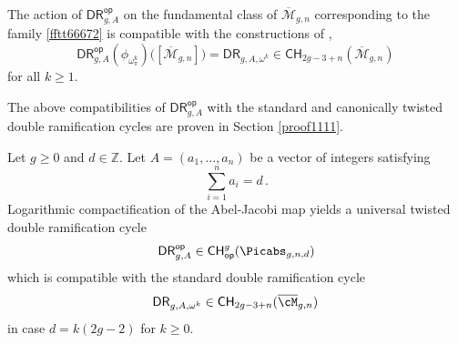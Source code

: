 The action of $\mathsf{DR}^{\mathsf{op}}_{g,A}$ on the fundamental class
of $\overline{\mathcal{M}}_{g,n}$ corresponding to the family \eqref{fftt66672} is compatible with the constructions of \cite{Guere2016A-generalizatio,Holmes2017Extending-the-d,Holmes2017Jacobian-extens,Marcus2017Logarithmic-com},
$$\mathsf{DR}^{\mathsf{op}}_{g,A} (\phi_{\omega_\pi^k})\Big( [\overline{\mathcal{M}}_{g,n}]\Big)= \mathsf{DR}_{g,A, \omega^k}
\in {\mathsf{CH}}_{2g-3+n}(\overline{\mathcal{M}}_{g,n})
\, $$
for all $k\geq 1$.

The above compatibilities of $\mathsf{DR}^{\mathsf{op}}_{g,A}$ with
the standard and canonically twisted double ramification cycles are proven in Section \ref{proof1111}.

\begin{theorem}
\notready \label{cccc}
Let $g\geq 0$ and $d\in \mathbb{Z}$.
Let $A=(a_1,\ldots,a_n)$ be a vector of integers satisfying
$$\sum_{i=1}^n a_i=d\, .$$
Logarithmic compactification of the Abel-Jacobi map yields a universal twisted double
ramification
cycle
$$\mathsf{DR}^{\mathsf{op}}_{g,A} \in {\mathsf{CH}}^g_{\mathsf{op}}(\Picabs_{g,n,d})$$
which is compatible with the standard double ramification
cycle
$$\mathsf{DR}_{g,A, \omega^k}\in \mathsf{CH}_{2g-3+n}(\overline{\cM}_{g,n})\, $$
in case $d=k(2g-2)$ for $k\geq 0$.
\end{theorem}




